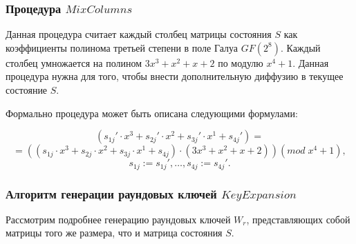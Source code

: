 \subsubsection{Процедура $MixColumns$} \label{MixColumns}

    Данная процедура считает каждый столбец матрицы состояния $S$ как коэффициенты полинома третьей степени в поле Галуа
    $GF(2^8)$. Каждый столбец умножается на полином $3x^3 + x^2 + x + 2$ по модулю $x^4 + 1$. Данная процедура нужна для того,
    чтобы внести дополнительную диффузию в текущее состояние $S$.

    Формально процедура может быть описана следующими формулами:

    \begin{equation}
        (s_{1j}' \cdot x^3 + s_{2j}' \cdot x^2 + s_{3j}' \cdot x^1 + s_{4j}') =
    \end{equation}
    \begin{equation}
        = \left( (s_{1j} \cdot x^3 + s_{2j} \cdot x^2 + s_{3j} \cdot x^1 + s_{4j}) \cdot (3x^3 + x^2 + x + 2) \right) (mod \; x^4 + 1),
    \end{equation}
    \begin{equation}
        s_{1j} := s_{1j}', \dots, s_{4j} := s_{4j}'.
    \end{equation}

\subsubsection{Алгоритм генерации раундовых ключей $KeyExpansion$} \label{KeyExpansion}

    Рассмотрим подробнее генерацию раундовых ключей $W_r$, представляющих собой матрицы того же размера,
    что и матрица состояния $S$.

